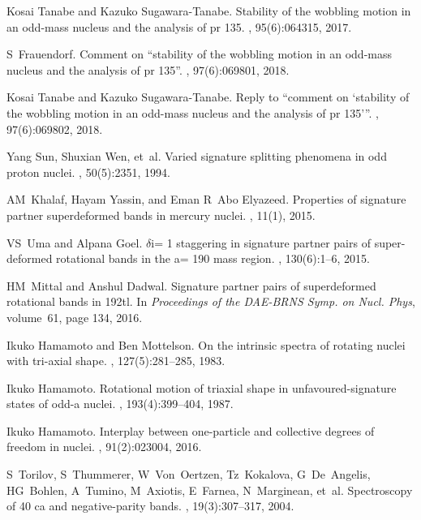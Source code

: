 \documentclass[11pt]{article}
\begin{document}
\begin{thebibliography}{99}
Kosai Tanabe and Kazuko Sugawara-Tanabe.
\newblock Stability of the wobbling motion in an odd-mass nucleus and the
  analysis of pr 135.
, 95(6):064315, 2017.

S~Frauendorf.
\newblock Comment on “stability of the wobbling motion in an odd-mass nucleus
  and the analysis of pr 135”.
, 97(6):069801, 2018.

Kosai Tanabe and Kazuko Sugawara-Tanabe.
\newblock Reply to “comment on ‘stability of the wobbling motion in an
  odd-mass nucleus and the analysis of pr 135’”.
, 97(6):069802, 2018.

Yang Sun, Shuxian Wen, et~al.
\newblock Varied signature splitting phenomena in odd proton nuclei.
, 50(5):2351, 1994.

AM~Khalaf, Hayam Yassin, and Eman R~Abo Elyazeed.
\newblock Properties of signature partner superdeformed bands in mercury
  nuclei.
, 11(1), 2015.

VS~Uma and Alpana Goel.
\newblock $\delta$i= 1 staggering in signature partner pairs of super-deformed
  rotational bands in the a= 190 mass region.
, 130(6):1--6, 2015.

HM~Mittal and Anshul Dadwal.
\newblock Signature partner pairs of superdeformed rotational bands in 192tl.
\newblock In {\em Proceedings of the DAE-BRNS Symp. on Nucl. Phys}, volume~61,
  page 134, 2016.

Ikuko Hamamoto and Ben Mottelson.
\newblock On the intrinsic spectra of rotating nuclei with tri-axial shape.
, 127(5):281--285, 1983.

Ikuko Hamamoto.
\newblock Rotational motion of triaxial shape in unfavoured-signature states of
  odd-a nuclei.
, 193(4):399--404, 1987.

Ikuko Hamamoto.
\newblock Interplay between one-particle and collective degrees of freedom in
  nuclei.
, 91(2):023004, 2016.

S~Torilov, S~Thummerer, W~Von~Oertzen, Tz~Kokalova, G~De~Angelis, HG~Bohlen,
  A~Tumino, M~Axiotis, E~Farnea, N~Marginean, et~al.
\newblock Spectroscopy of 40 ca and negative-parity bands.
,
  19(3):307--317, 2004.


\end{thebibliography}
\end{document}
